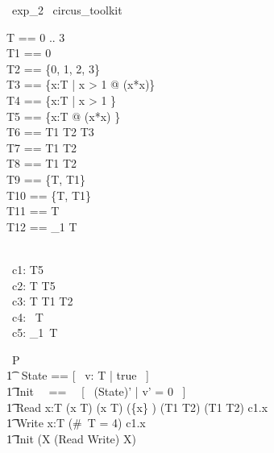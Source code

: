 
\begin{zsection}
  \SECTION\ exp\_2 \parents\ circus\_toolkit
\end{zsection}

\begin{zed}
	T == 0 .. 3 \\
	T1 == 0  \\
    T2 == \{0, 1, 2, 3\} \\
    T3 == \{x:T | x > 1 @ (x*x)\} \\
    T4 == \{x:T | x > 1 \} \\
    T5 == \{x:T @ (x*x) \} \\
    T6 == T1 \cup T2 \cap T3 \\
    T7 == T1 \setminus T2 \\
    T8 == T1 \symdiff T2 \\
    T9 == \bigcup \{T, T1\} \\
    T10 == \bigcap \{T, T1\} \\
    T11 == \finset T \\
    T12 == \finset_1 T \\
    [NAME] \\
\end{zed}

\begin{circus}
	\circchannel\ c1: T5 \\
	\circchannel\ c2: T \cross T5 \\
	\circchannel\ c3: T \cross T1 \cross T2 \\
	\circchannel\ c4: \power~T \\
	\circchannel\ c5: \power_1~T \\
\end{circus}

\begin{circus}
    \circprocess\ P \circdef \circbegin \\
        \t1 \circstate\ State == [~ v: T | true ~] \\
        \t1 Init ~~==~~ [~ (State)' | v' = 0 ~] \\
        \t1 Read \circdef \circvar x:T \circspot \lcircguard (x \in T) \land (x \notin T) \land (\{x\} \neq \emptyset) \land (T1 \subseteq T2) \land (T1 \subset T2) \rcircguard \circguard c1.x \then \Skip \\
        \t1 Write \circdef \circvar x:T \circspot \lcircguard (\#~T = 4) \rcircguard \circguard c1.x \then \Skip \\
        \t1 \circspot \lschexpract Init \rschexpract \circseq (\circmu X \circspot (Read \extchoice Write) \circseq X) \\ 
	\circend
\end{circus}

